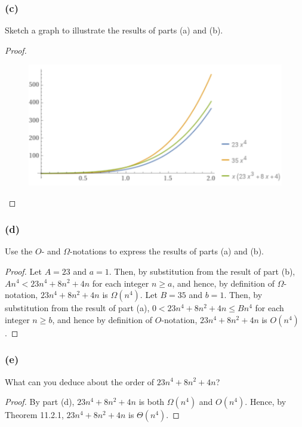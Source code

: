 \documentclass[14pt]{extarticle}
\begin{document}
\subsubsection{(c)}
Sketch a graph to illustrate the results of parts (a) and (b).
\begin{proof}
    \begin{figure}[ht!]
        \centering
        \includegraphics[scale=0.5]{../images/11.2.11.c.png}
    \end{figure}
\end{proof}

\subsubsection{(d)}
Use the \(O\)- and \(\Omega\)-notations to express the results of parts (a) and (b).

\begin{proof}
    Let \(A = 23\) and \(a = 1\). Then, by substitution from the result of part (b), \(An^4 < 23n^4 + 8n^2 + 4n\) for each
    integer \(n \geq a\), and hence, by definition of \(\Omega\)-notation, \(23n^4 + 8n^2 + 4n\) is \(\Omega(n^4)\). Let
    \(B = 35\) and \(b = 1\). Then, by substitution from the result of part (a), \(0 < 23n^4 + 8n^2 + 4n \leq Bn^4\) for
    each integer \(n \geq b\), and hence by definition of \(O\)-notation, \(23n^4 + 8n^2 + 4n\) is \(O(n^4)\).
\end{proof}

\subsubsection{(e)}
What can you deduce about the order of \(23n^4 + 8n^2 + 4n\)?
\begin{proof}
    By part (d), \(23n^4 + 8n^2 + 4n\) is both \(\Omega(n^4)\) and \(O(n^4)\). Hence, by Theorem 11.2.1, \(23n^4 + 8n^2 + 4n\) is
    \(\Theta(n^4)\).
\end{proof}
\end{document}
